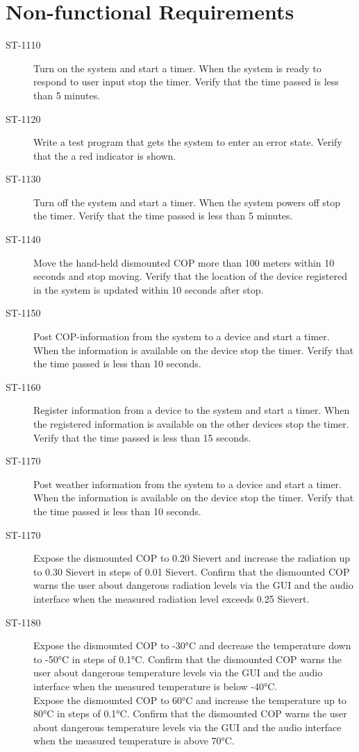 \section{Non-functional Requirements}

\begin{description}
\item[ST-1110] Turn on the system and start a timer. When the system is ready to respond to user input stop the timer. Verify that the time passed is less than 5 minutes.

\item[ST-1120]Write a test program that gets the system to enter an error state. Verify that the a red indicator is shown. 

\item[ST-1130] Turn off the system and start a timer. When the system powers off stop the timer. Verify that the time passed is less than 5 minutes.

\item[ST-1140]Move the hand-held dismounted COP more than 100 meters within 10 seconds and stop moving. Verify that the location of the device registered in the system is updated within 10 seconds after stop. 

\item[ST-1150]Post COP-information from the system to a device and start a timer. When the information is available on the device stop the timer. Verify that the time passed is less than 10 seconds. 

\item[ST-1160]Register information from a device to the system and start a timer. When the registered information is available on the other devices stop the timer. Verify that the time passed is less than 15 seconds. 

\item[ST-1170]Post weather information from the system to a device and start a timer. When the information is available on the device stop the timer. Verify that the time passed is less than 10 seconds. 

\item[ST-1170] Expose the dismounted COP to 0.20 Sievert and increase the radiation up to 0.30 Sievert in steps of 0.01 Sievert. Confirm that the dismounted COP warns the user about dangerous radiation levels via the GUI and the audio interface when the measured radiation level exceeds 0.25 Sievert. 

\item[ST-1180] Expose the dismounted COP to -30°C and decrease the temperature down to -50°C in steps of 0.1°C. Confirm that the dismounted COP warns the user about dangerous temperature levels via the GUI and the audio interface when the measured temperature is below -40°C.\\
Expose the dismounted COP to 60°C and increase the temperature up to 80°C in steps of 0.1°C. Confirm that the dismounted COP warns the user about dangerous temperature levels via the GUI and the audio interface when the measured temperature is above 70°C. 


\end{description}
